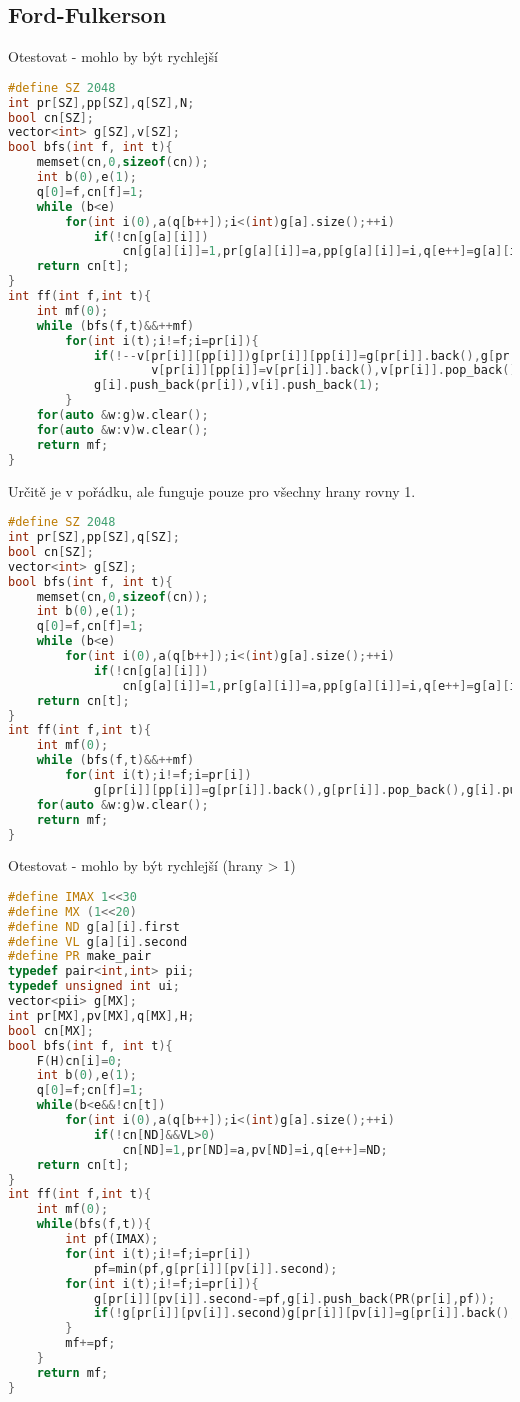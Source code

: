 \documentclass[11pt]{article}
\begin{document}
\subsection{Ford-Fulkerson}
Otestovat - mohlo by být rychlejší
\begin{lstlisting}[language=C++]
#define SZ 2048
int pr[SZ],pp[SZ],q[SZ],N;
bool cn[SZ];
vector<int> g[SZ],v[SZ];
bool bfs(int f, int t){
    memset(cn,0,sizeof(cn));
    int b(0),e(1);
    q[0]=f,cn[f]=1;
    while (b<e)
        for(int i(0),a(q[b++]);i<(int)g[a].size();++i)
            if(!cn[g[a][i]])
                cn[g[a][i]]=1,pr[g[a][i]]=a,pp[g[a][i]]=i,q[e++]=g[a][i];
    return cn[t];
}
int ff(int f,int t){
    int mf(0);
    while (bfs(f,t)&&++mf)
        for(int i(t);i!=f;i=pr[i]){
            if(!--v[pr[i]][pp[i]])g[pr[i]][pp[i]]=g[pr[i]].back(),g[pr[i]].pop_back(),
                    v[pr[i]][pp[i]]=v[pr[i]].back(),v[pr[i]].pop_back();
            g[i].push_back(pr[i]),v[i].push_back(1);
        }
    for(auto &w:g)w.clear();
    for(auto &w:v)w.clear();
    return mf;
}
\end{lstlisting}
Určitě je v pořádku, ale funguje pouze pro všechny hrany rovny 1.
\begin{lstlisting}[language=C++]
#define SZ 2048
int pr[SZ],pp[SZ],q[SZ];
bool cn[SZ];
vector<int> g[SZ];
bool bfs(int f, int t){
    memset(cn,0,sizeof(cn));
    int b(0),e(1);
    q[0]=f,cn[f]=1;
    while (b<e)
        for(int i(0),a(q[b++]);i<(int)g[a].size();++i)
            if(!cn[g[a][i]])
                cn[g[a][i]]=1,pr[g[a][i]]=a,pp[g[a][i]]=i,q[e++]=g[a][i];
    return cn[t];
}
int ff(int f,int t){
    int mf(0);
    while (bfs(f,t)&&++mf)
        for(int i(t);i!=f;i=pr[i])
            g[pr[i]][pp[i]]=g[pr[i]].back(),g[pr[i]].pop_back(),g[i].push_back(pr[i]);
    for(auto &w:g)w.clear();
    return mf;
}
\end{lstlisting}
Otestovat - mohlo by být rychlejší (hrany > 1)
\begin{lstlisting}[language=C++]
#define IMAX 1<<30
#define MX (1<<20)
#define ND g[a][i].first
#define VL g[a][i].second
#define PR make_pair
typedef pair<int,int> pii;
typedef unsigned int ui;
vector<pii> g[MX];
int pr[MX],pv[MX],q[MX],H;
bool cn[MX];
bool bfs(int f, int t){
    F(H)cn[i]=0;
    int b(0),e(1);
    q[0]=f;cn[f]=1;
    while(b<e&&!cn[t])
        for(int i(0),a(q[b++]);i<(int)g[a].size();++i)
            if(!cn[ND]&&VL>0)
                cn[ND]=1,pr[ND]=a,pv[ND]=i,q[e++]=ND;
    return cn[t];
}
int ff(int f,int t){
    int mf(0);
    while(bfs(f,t)){
        int pf(IMAX);
        for(int i(t);i!=f;i=pr[i])
            pf=min(pf,g[pr[i]][pv[i]].second);
        for(int i(t);i!=f;i=pr[i]){
            g[pr[i]][pv[i]].second-=pf,g[i].push_back(PR(pr[i],pf));
            if(!g[pr[i]][pv[i]].second)g[pr[i]][pv[i]]=g[pr[i]].back(),g[pr[i]].pop_back();//TRY!
        }
        mf+=pf;
    }
    return mf;
}
\end{lstlisting}
\end{document}
